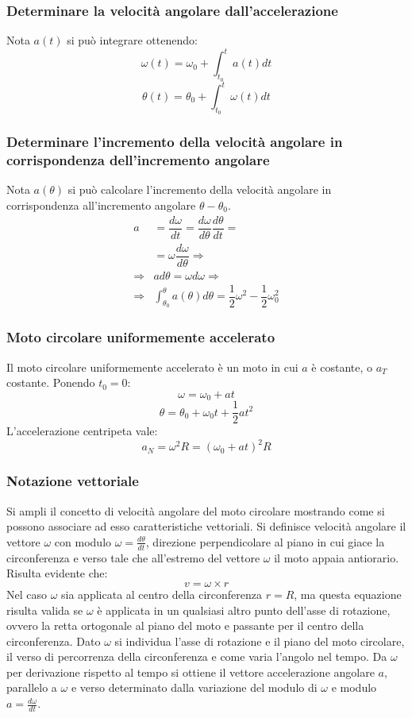 \documentclass[class=book, crop=false, oneside, 12pt]{standalone}
\begin{document}
		\subsubsection{Determinare la velocit\`a angolare dall'accelerazione}
		Nota $a(t)$ si pu\`o integrare ottenendo:
		$$\omega(t)=\omega_0+\int_{t_0}^ta(t)dt$$
		$$\theta(t)=\theta_0+\int_{t_0}^t\omega(t)dt$$
		\subsubsection{Determinare l'incremento della velocit\`a angolare in corrispondenza dell'incremento angolare}
		Nota $a(\theta)$ si pu\`o calcolare l'incremento della velocit\`a angolare in corrispondenza all'incremento angolare $\theta-\theta_0$.
		\begin{align*}
			a&=\dfrac{d\omega}{dt}=\dfrac{d\omega}{d\theta}\dfrac{d\theta}{dt}=\\
			 &=\omega\dfrac{d\omega}{d\theta}\Rightarrow\\
			\Rightarrow&ad\theta=\omega d\omega\Rightarrow\\
			\Rightarrow&\int_{\theta_0}^\theta a(\theta)d\theta=\dfrac{1}{2}\omega^2-\dfrac{1}{2}\omega_0^2
		\end{align*}
		\subsubsection{Moto circolare uniformemente accelerato}
		Il moto circolare uniformemente accelerato \`e un moto in cui $a$ \`e costante, o $a_T$ costante.
		Ponendo $t_0=0$:
		$$\omega=\omega_0+at$$
		$$\theta=\theta_0+\omega_0t+\dfrac{1}{2}at^2$$
		L'accelerazione centripeta vale:
		$$a_N=\omega^2R=(\omega_0+at)^2R$$
		\subsubsection{Notazione vettoriale}
		Si ampli il concetto di velocit\`a angolare del moto circolare mostrando come si possono associare ad esso caratteristiche vettoriali.
		Si definisce velocit\`a angolare il vettore $\omega$ con modulo $\omega=\frac{d\theta}{dt}$, direzione perpendicolare al piano in cui giace la circonferenza e verso tale che all'estremo del vettore $\omega$ il moto appaia antiorario.
		Risulta evidente che:
		$$v=\omega\times r$$
		Nel caso $\omega$ sia applicata al centro della circonferenza $r=R$, ma questa equazione risulta valida se $\omega$ \`e applicata in un qualsiasi altro punto dell'asse di rotazione, ovvero la retta ortogonale al piano del moto e passante per il centro della circonferenza.
		Dato $\omega$ si individua l'asse di rotazione e il piano del moto circolare, il verso di percorrenza della circonferenza e come varia l'angolo nel tempo.
		Da $\omega$ per derivazione rispetto al tempo si ottiene il vettore accelerazione angolare $a$, parallelo a $\omega$ e verso determinato dalla variazione del modulo di $\omega$ e modulo $a=\frac{d\omega}{dt}$.
\end{document}
